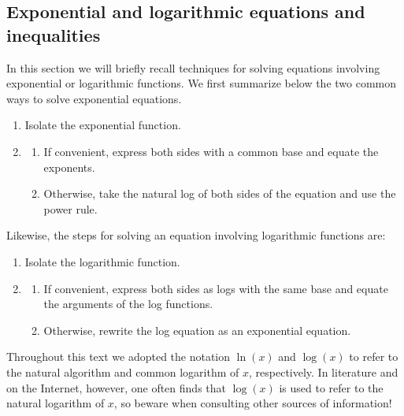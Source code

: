 \fi

\subsection{Exponential and logarithmic equations and inequalities}
In this section we will briefly recall techniques for solving equations involving exponential or logarithmic functions.  We first summarize below the two common ways to solve exponential equations.

\begin{enumerate}

\item  Isolate the exponential function.

\item  \begin{enumerate}

\item  If convenient, express both sides with a common base and equate the exponents.

\item  Otherwise, take the natural log of both sides of the equation and use the power rule.


\end{enumerate}
\end{enumerate}
 
Likewise, the steps for solving an equation involving logarithmic functions are:

\begin{enumerate}

\item  Isolate the logarithmic function.

\item  \begin{enumerate}

\item  If convenient, express both sides as logs with the same base and equate the arguments of the log functions.

\item  Otherwise, rewrite the log equation as an exponential equation.


\end{enumerate}
\end{enumerate}




\ifcourse
\begin{remark}
Throughout this text we adopted the notation $\ln(x)$ and $\log(x)$ to refer to the natural algorithm and common logarithm of $x$, respectively. In literature and on the Internet, however, one often finds that $\log(x)$ is used to refer to the natural logarithm of $x$, so beware when consulting other sources of information! 
\end{remark}
\fi



